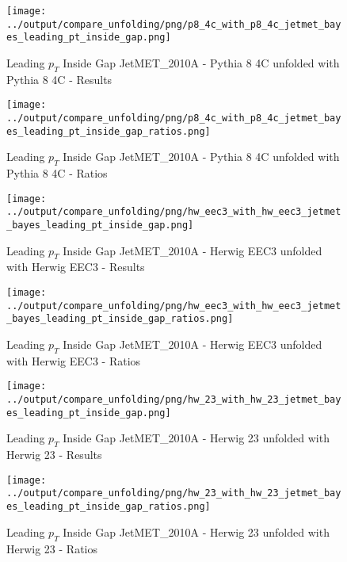 \documentclass[11pt]{book}
\begin{document}
\begin{figure}[ht]
\centering
\texttt{[image: ../output/compare\_unfolding/png/p8\_4c\_with\_p8\_4c\_jetmet\_bayes\_leading\_pt\_inside\_gap.png]}
\caption{Leading $p_{T}$ Inside Gap JetMET\_2010A - Pythia 8 4C unfolded with Pythia 8 4C - Results}
\label{p8_p8_jetmet_bayes_leading_pt_inside_gap_a}
\end{figure}

\begin{figure}[ht]
\centering
\texttt{[image: ../output/compare\_unfolding/png/p8\_4c\_with\_p8\_4c\_jetmet\_bayes\_leading\_pt\_inside\_gap\_ratios.png]}
\caption{Leading $p_{T}$ Inside Gap JetMET\_2010A - Pythia 8 4C unfolded with Pythia 8 4C - Ratios}
\label{p8_p8_jetmet_bayes_leading_pt_inside_gap_b}
\end{figure}

\begin{figure}[ht]
\centering
\texttt{[image: ../output/compare\_unfolding/png/hw\_eec3\_with\_hw\_eec3\_jetmet\_bayes\_leading\_pt\_inside\_gap.png]}
\caption{Leading $p_{T}$ Inside Gap JetMET\_2010A - Herwig EEC3 unfolded with Herwig EEC3 - Results}
\label{hw_eec3_hw_eec3_jetmet_bayes_leading_pt_inside_gap_a}
\end{figure}

\begin{figure}[ht]
\centering
\texttt{[image: ../output/compare\_unfolding/png/hw\_eec3\_with\_hw\_eec3\_jetmet\_bayes\_leading\_pt\_inside\_gap\_ratios.png]}
\caption{Leading $p_{T}$ Inside Gap JetMET\_2010A - Herwig EEC3 unfolded with Herwig EEC3 - Ratios}
\label{hw_eec3_hw_eec3_jetmet_bayes_leading_pt_inside_gap_b}
\end{figure}

\begin{figure}[ht]
\centering
\texttt{[image: ../output/compare\_unfolding/png/hw\_23\_with\_hw\_23\_jetmet\_bayes\_leading\_pt\_inside\_gap.png]}
\caption{Leading $p_{T}$ Inside Gap JetMET\_2010A - Herwig 23 unfolded with Herwig 23 - Results}
\label{hw_23_hw_23_jetmet_bayes_leading_pt_inside_gap_a}
\end{figure}

\begin{figure}[ht]
\centering
\texttt{[image: ../output/compare\_unfolding/png/hw\_23\_with\_hw\_23\_jetmet\_bayes\_leading\_pt\_inside\_gap\_ratios.png]}
\caption{Leading $p_{T}$ Inside Gap JetMET\_2010A - Herwig 23 unfolded with Herwig 23 - Ratios}
\label{hw_23_hw_23_jetmet_bayes_leading_pt_inside_gap_b}
\end{figure}
\end{document}
